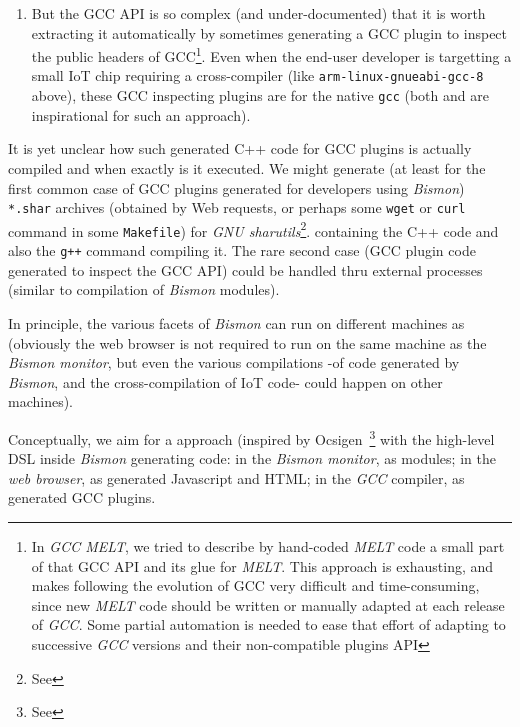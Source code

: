 \begin{itemize}
\begin{enumerate}
      \item But the GCC API is so complex (and under-documented) that
        it is worth extracting it automatically by sometimes
        generating a GCC plugin to inspect the public headers of
        GCC\footnote{In \emph{GCC MELT}, we tried to describe by
          hand-coded \emph{MELT} code a small part of that GCC API and
          its glue for \emph{MELT}. This approach is exhausting, and
          makes following the evolution of GCC very difficult and
          time-consuming, since new \emph{MELT} code should be written
          or manually adapted at each release of \emph{GCC}. Some
          partial automation is needed to ease that effort of adapting
          to successive \emph{GCC} versions and their non-compatible
          plugins API}. Even when the end-user developer is targetting
        a small IoT chip requiring a cross-compiler (like
        \texttt{arm-linux-gnueabi-gcc-8} above), these GCC inspecting
        plugins are for the native \texttt{gcc} (both
        \cite{Schafmeister:2016:CANDO} and
        \cite{Schafmeister:2015:CLASP} are inspirational for such an
        approach).
        
    \end{enumerate}

    It is yet unclear how such generated C++ code for GCC plugins is
    actually compiled and when exactly is it executed. We might
    generate (at least for the first common case of GCC plugins
    generated for developers using \emph{Bismon}) \texttt{*.shar}
    archives (obtained by Web requests, or perhaps some \texttt{wget}
    or \texttt{curl} command in some \texttt{Makefile}) for
    \emph{GNU sharutils}\footnote{See
      }. containing the
    C++ code and also the \texttt{g++} command compiling it. The rare
    second case (GCC plugin code generated to inspect the GCC API)
    could be handled thru external processes (similar to compilation
    of \emph{Bismon} modules).
    
\end{itemize}

In principle, the various facets of \emph{Bismon} can run on different
machines as 
(obviously the web browser is not required to run on the same machine
as the \emph{Bismon monitor}, but even the various compilations -of
code generated by \emph{Bismon}, and the cross-compilation of IoT
code- could happen on other machines).

Conceptually, we aim for a  approach (inspired by
Ocsigen~\footnote{See } with the high-level
DSL inside \emph{Bismon} generating code: in the \emph{Bismon
  monitor}, as modules; in the \emph{web browser}, as generated
Javascript and HTML; in the \emph{GCC} compiler, as generated GCC plugins.
